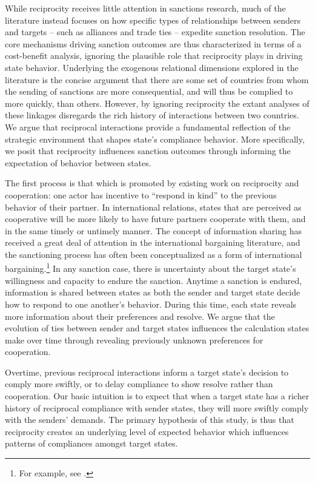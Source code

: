 While reciprocity receives little attention in sanctions research, much of the literature instead focuses on how specific types of relationships between senders and targets -- such as alliances and trade ties -- expedite sanction resolution. The core mechanisms driving sanction outcomes are thus characterized in terms of a cost-benefit analysis, ignoring the plausible role that reciprocity plays in driving state behavior. Underlying the exogenous relational dimensions explored in the literature is the concise argument that there are some set of countries from whom the sending of sanctions are more consequential, and will thus be complied to more quickly, than others. However, by ignoring reciprocity the extant analyses of these linkages disregards the rich history of interactions between two countries. We argue that reciprocal interactions provide a fundamental reflection of the strategic environment that shapes state's compliance behavior. More specifically, we posit that reciprocity influences sanction outcomes through informing the expectation of behavior between states. 

The first process is that which is promoted by existing work on reciprocity and cooperation: one actor has incentive to ``respond in kind'' to the previous behavior of their partner. In international relations, states that are perceived as cooperative will be more likely to have future partners cooperate with them, and in the same timely or untimely manner. The concept of information sharing has received a great deal of attention in the international bargaining literature, and the sanctioning process has often been conceptualized as a form of international bargaining.\footnote{For example, see \cite{morgan1999threats,lacy2004theory,marinov2005}.} In any sanction case, there is uncertainty about the target state's willingness and capacity to endure the sanction.  Anytime a sanction is endured, information is shared between states as both the sender and target state decide how to respond to one another's behavior. During this time, each state reveals more information about their preferences and resolve. We argue that the evolution of ties between sender and target states influences the calculation states make over time through revealing previously unknown preferences for cooperation. 

Overtime, previous reciprocal interactions inform a target state's decision to comply more swiftly, or to delay compliance to show resolve rather than cooperation. Our basic intuition is to expect that when a target state has a richer history of reciprocal compliance with sender states, they will more swiftly comply with the senders' demands. The primary hypothesis of this study, is thus that reciprocity creates an underlying level of expected behavior which influences patterns of compliances amongst target states. 

